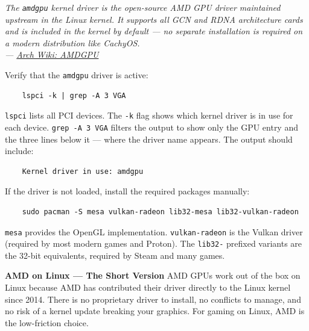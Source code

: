 \documentclass{article}
\newcommand{\code}[1]{\colorbox{codebg}{\texttt{#1}}}
\begin{document}
\begin{mdframed}[linewidth=1.5pt, linecolor=black!50, topline=true, bottomline=true,
	leftline=false, rightline=false, backgroundcolor=black!3]
	\small\itshape
	The \texttt{amdgpu} kernel driver is the open-source AMD GPU driver maintained
	upstream in the Linux kernel. It supports all GCN and RDNA architecture cards
	and is included in the kernel by default --- no separate installation is required
	on a modern distribution like CachyOS.\\[4pt]
	\normalfont\small ---
	\href{https://wiki.archlinux.org/title/AMDGPU}{Arch Wiki: AMDGPU}
\end{mdframed}

\noindent Verify that the \code{amdgpu} driver is active:

\begin{verbatim}
	lspci -k | grep -A 3 VGA
\end{verbatim}

\noindent \code{lspci} lists all PCI devices. The \code{-k} flag shows which kernel driver
is in use for each device. \code{grep -A 3 VGA} filters the output to show only
the GPU entry and the three lines below it --- where the driver name appears. The
output should include:

\begin{verbatim}
	Kernel driver in use: amdgpu
\end{verbatim}

\noindent If the driver is not loaded, install the required packages manually:

\begin{verbatim}
	sudo pacman -S mesa vulkan-radeon lib32-mesa lib32-vulkan-radeon
\end{verbatim}

\code{mesa} provides the OpenGL implementation. \code{vulkan-radeon} is the
Vulkan driver (required by most modern games and Proton). The \code{lib32-}
prefixed variants are the 32-bit equivalents, required by Steam and many games.

\begin{callout}{\textbf{AMD on Linux --- The Short Version}}
	AMD GPUs work out of the box on Linux because AMD has contributed their driver
	directly to the Linux kernel since 2014. There is no proprietary driver to
	install, no conflicts to manage, and no risk of a kernel update breaking your
	graphics. For gaming on Linux, AMD is the low-friction choice.
\end{callout}
\end{document}
